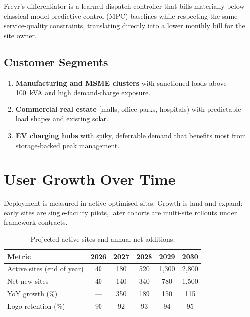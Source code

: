\documentclass[journal,article,submit,moreauthors]{Definitions/mdpi}
\begin{document}
Freyr's differentiator is a learned dispatch controller that bills materially
below classical model-predictive control (MPC) baselines while respecting the
same service-quality constraints, translating directly into a lower monthly
bill for the site owner.

\subsection{Customer Segments}\label{sec:segments}

\begin{enumerate}
	\item \textbf{Manufacturing and MSME clusters} with sanctioned loads above
	      100~kVA and high demand-charge exposure.
	\item \textbf{Commercial real estate} (malls, office parks, hospitals) with
	      predictable load shapes and existing solar.
	\item \textbf{EV charging hubs} with spiky, deferrable demand that benefits
	      most from storage-backed peak management.
\end{enumerate}

\section{User Growth Over Time}\label{sec:users}

Deployment is measured in active optimised sites. Growth is land-and-expand:
early sites are single-facility pilots, later cohorts are multi-site rollouts
under framework contracts.

\begin{table}[H]
	\caption{Projected active sites and annual net additions.}
	\label{tab:users}
	\begin{tabularx}{\textwidth}{lCCCCC}
		\toprule
		\textbf{Metric} & \textbf{2026} & \textbf{2027} & \textbf{2028}
		& \textbf{2029} & \textbf{2030} \\
		\midrule
		Active sites (end of year) & 40 & 180 & 520 & 1{,}300 & 2{,}800 \\
		Net new sites              & 40 & 140 & 340 & 780   & 1{,}500 \\
		YoY growth (\%)            & --- & 350 & 189 & 150   & 115   \\
		Logo retention (\%)        & 90 & 92  & 93  & 94    & 95    \\
		\bottomrule
	\end{tabularx}
\end{table}
\end{document}
